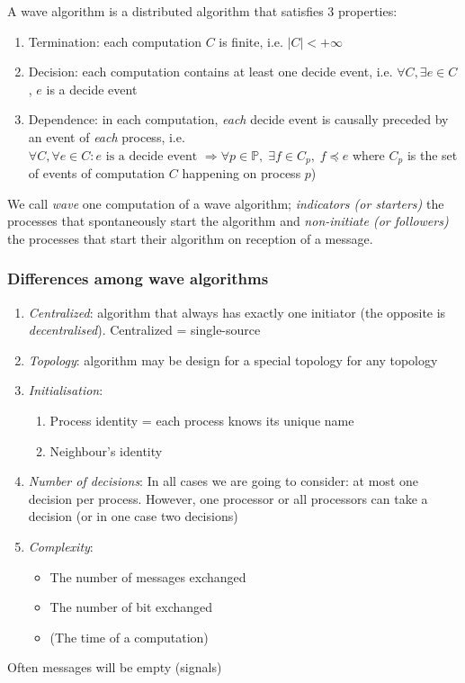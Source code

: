 \begin{defi}
A wave algorithm is a distributed algorithm that satisfies 3 properties:
\begin{enumerate}
\item Termination: each computation $C$ is finite, i.e. $|C|<+\infty$
\item Decision: each computation contains at least one decide event, i.e. $\forall C, \exists e \in C$, $e$ is a decide event
\item Dependence: in each computation, \emph{each} decide event is causally preceded by an event of \emph{each} process, i.e. $\forall C, \forall e\in C : \text{$e$ is a decide event } \Rightarrow \forall p \in \mathbb{P}, \; \exists f \in C_p,\; f\preceq e$ where $C_p$ is the set of events of computation $C$ happening on process $p$)
\end{enumerate} 
\end{defi}

We call \emph{wave} one computation of a wave algorithm; \emph{indicators (or starters)} the processes that spontaneously start the algorithm and \emph{non-initiate (or followers)} the processes that start their algorithm on reception of a message.

\subsubsection*{Differences among wave algorithms}
\begin{enumerate}
\item \emph{Centralized}: algorithm that always has exactly one initiator (the opposite is \emph{decentralised}). Centralized = single-source
\item \emph{Topology}: algorithm may be design for a special topology for any topology
\item \emph{Initialisation}: 
\begin{enumerate}
\item Process identity = each process knows its unique name
\item Neighbour's identity
\end{enumerate}
\item \emph{Number of decisions}: In all cases we are going to consider: at most one decision per process. However, one processor or all processors can take a decision (or in one case two decisions)
\item \emph{Complexity}: 
\begin{itemize}
\item The number of messages exchanged
\item The number of bit exchanged
\item (The time of a computation)
\end{itemize}
\end{enumerate}
Often messages will be empty (signals)

